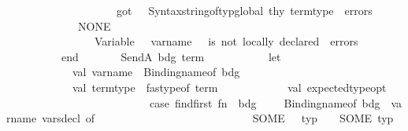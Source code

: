 \begin{isabellebody}
\ \ \ \ \ \ \ \ \ \ \ \ \ \ \ \ \ \ \ {\isachardoublequote}{\kern0pt}{\isacharcomma}{\kern0pt}\ got\ {\isachardoublequote}{\kern0pt}\ {\isacharcircum}{\kern0pt}\ Syntax{\isachardot}{\kern0pt}string{\isacharunderscore}{\kern0pt}of{\isacharunderscore}{\kern0pt}typ{\isacharunderscore}{\kern0pt}global\ thy\ term{\isacharunderscore}{\kern0pt}type{\isacharparenright}{\kern0pt}\ {\isacharcolon}{\kern0pt}{\isacharcolon}{\kern0pt}\ errors\isanewline
\ \ \ \ \ \ \ \ \ \ \ \ {\isacharbar}{\kern0pt}\ NONE\ {\isacharequal}{\kern0pt}{\isachargreater}{\kern0pt}\isanewline
\ \ \ \ \ \ \ \ \ \ \ \ \ \ \ \ {\isacharparenleft}{\kern0pt}{\isachardoublequote}{\kern0pt}Variable\ {\isachardoublequote}{\kern0pt}\ {\isacharcircum}{\kern0pt}\ var{\isacharunderscore}{\kern0pt}name\ {\isacharcircum}{\kern0pt}\ {\isachardoublequote}{\kern0pt}\ is\ not\ locally\ declared{\isachardoublequote}{\kern0pt}{\isacharparenright}{\kern0pt}\ {\isacharcolon}{\kern0pt}{\isacharcolon}{\kern0pt}\ errors\isanewline
\ \ \ \ \ \ \ \ \ \ end\isanewline
\isanewline
\ \ \ \ \ \ {\isacharbar}{\kern0pt}\ SendA\ {\isacharparenleft}{\kern0pt}bdg{\isacharcomma}{\kern0pt}\ term{\isacharparenright}{\kern0pt}\ {\isacharequal}{\kern0pt}{\isachargreater}{\kern0pt}\isanewline
\ \ \ \ \ \ \ \ \ \ let\isanewline
\ \ \ \ \ \ \ \ \ \ \ \ val\ var{\isacharunderscore}{\kern0pt}name\ {\isacharequal}{\kern0pt}\ Binding{\isachardot}{\kern0pt}name{\isacharunderscore}{\kern0pt}of\ bdg\isanewline
\ \ \ \ \ \ \ \ \ \ \ \ val\ term{\isacharunderscore}{\kern0pt}type\ {\isacharequal}{\kern0pt}\ fastype{\isacharunderscore}{\kern0pt}of\ term\isanewline
\ \ \ \ \ \ \ \ \ \ \ \ val\ expected{\isacharunderscore}{\kern0pt}type{\isacharunderscore}{\kern0pt}opt\ {\isacharequal}{\kern0pt}\ \isanewline
\ \ \ \ \ \ \ \ \ \ \ \ \ \ \ \ \ \ \ \ \ \ \ \ \ \ case\ find{\isacharunderscore}{\kern0pt}first\ {\isacharparenleft}{\kern0pt}fn\ {\isacharparenleft}{\kern0pt}\ bdg{\isacharprime}{\kern0pt}{\isacharcomma}{\kern0pt}\ {\isacharunderscore}{\kern0pt}{\isacharcomma}{\kern0pt}\ {\isacharunderscore}{\kern0pt}{\isacharcomma}{\kern0pt}\ {\isacharunderscore}{\kern0pt}{\isacharparenright}{\kern0pt}\ {\isacharequal}{\kern0pt}{\isachargreater}{\kern0pt}\ Binding{\isachardot}{\kern0pt}name{\isacharunderscore}{\kern0pt}of\ bdg{\isacharprime}{\kern0pt}\ {\isacharequal}{\kern0pt}\ var{\isacharunderscore}{\kern0pt}name{\isacharparenright}{\kern0pt}\ vars{\isacharunderscore}{\kern0pt}decl\ of\isanewline
\ \ \ \ \ \ \ \ \ \ \ \ \ \ \ \ \ \ \ \ \ \ \ \ \ \ \ \ SOME\ {\isacharparenleft}{\kern0pt}\ {\isacharunderscore}{\kern0pt}{\isacharcomma}{\kern0pt}\ typ{\isacharcomma}{\kern0pt}\ {\isacharunderscore}{\kern0pt}{\isacharcomma}{\kern0pt}\ {\isacharunderscore}{\kern0pt}{\isacharparenright}{\kern0pt}\ {\isacharequal}{\kern0pt}{\isachargreater}{\kern0pt}\ SOME\ typ\isanewline

\end{isabellebody}
